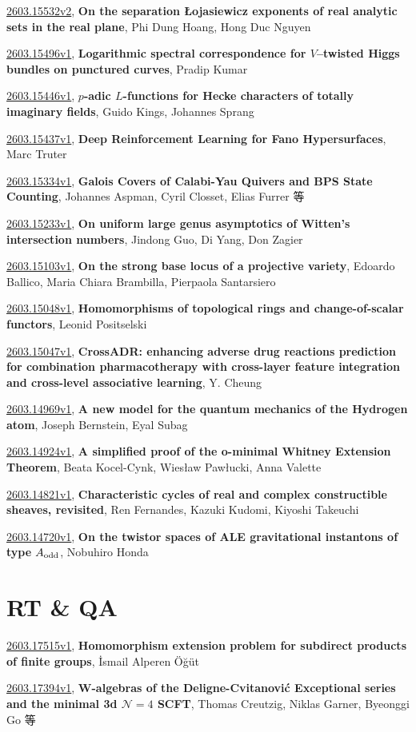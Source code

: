 \documentclass[9pt, a4paper]{article}
\theoremstyle{plain}
\theoremstyle{definition}
\theoremstyle{remark}
\newcommand{\arxiv}[3]{\href{https://arxiv.org/abs/#1}{#1}, \textbf{\textcolor{arxivblue}{#2}}, #3}
\begin{document}
\arxiv{2603.15532v2}{On the separation Łojasiewicz exponents of real analytic sets in the real plane}{Phi Dung Hoang, Hong Duc Nguyen}

\arxiv{2603.15496v1}{Logarithmic spectral correspondence for $V$--twisted Higgs bundles on punctured curves}{Pradip Kumar}

\arxiv{2603.15446v1}{$p$-adic $L$-functions for Hecke characters of totally imaginary fields}{Guido Kings, Johannes Sprang}

\arxiv{2603.15437v1}{Deep Reinforcement Learning for Fano Hypersurfaces}{Marc Truter}

\arxiv{2603.15334v1}{Galois Covers of Calabi-Yau Quivers and BPS State Counting}{Johannes Aspman, Cyril Closset, Elias Furrer 等}

\arxiv{2603.15233v1}{On uniform large genus asymptotics of Witten's intersection numbers}{Jindong Guo, Di Yang, Don Zagier}

\arxiv{2603.15103v1}{On the strong base locus of a projective variety}{Edoardo Ballico, Maria Chiara Brambilla, Pierpaola Santarsiero}

\arxiv{2603.15048v1}{Homomorphisms of topological rings and change-of-scalar functors}{Leonid Positselski}

\arxiv{2603.15047v1}{CrossADR: enhancing adverse drug reactions prediction for combination pharmacotherapy with cross-layer feature integration and cross-level associative learning}{Y. Cheung}

\arxiv{2603.14969v1}{A new model for the quantum mechanics of the Hydrogen atom}{Joseph Bernstein, Eyal Subag}

\arxiv{2603.14924v1}{A simplified proof of the o-minimal Whitney Extension Theorem}{Beata Kocel-Cynk, Wiesław Pawłucki, Anna Valette}

\arxiv{2603.14821v1}{Characteristic cycles of real and complex constructible sheaves, revisited}{Ren Fernandes, Kazuki Kudomi, Kiyoshi Takeuchi}

\arxiv{2603.14720v1}{On the twistor spaces of ALE gravitational instantons of type $A_{\rm odd}$}{Nobuhiro Honda}


\section{RT \& QA}
\arxiv{2603.17515v1}{Homomorphism extension problem for subdirect products of finite groups}{İsmail Alperen Öğüt}

\arxiv{2603.17394v1}{W-algebras of the Deligne-Cvitanović Exceptional series and the minimal 3d ${\mathcal N}=4$ SCFT}{Thomas Creutzig, Niklas Garner, Byeonggi Go 等}
\end{document}
